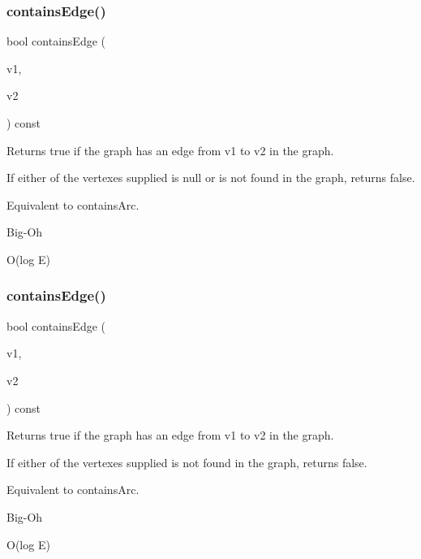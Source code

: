 \subsubsection{\texorpdfstring{contains\+Edge()}{containsEdge()}\hspace{0.1cm}{\footnotesize\ttfamily [1/3]}}
{\footnotesize\ttfamily bool contains\+Edge (\begin{DoxyParamCaption}\item[{\mbox{\hyperlink{classVertexGen}{Vertex\+Gen}}$<$ V, E $>$ $\ast$}]{v1,  }\item[{\mbox{\hyperlink{classVertexGen}{Vertex\+Gen}}$<$ V, E $>$ $\ast$}]{v2 }\end{DoxyParamCaption}) const}



Returns true if the graph has an edge from v1 to v2 in the graph. 

If either of the vertexes supplied is null or is not found in the graph, returns false.

Equivalent to contains\+Arc. \begin{DoxyRefDesc}{Big-\/\+Oh}
\item[\mbox{\hyperlink{BigOh__BigOh000011}{Big-\/\+Oh}}]O(log E) \end{DoxyRefDesc}
\mbox{\label{classBasicGraphGen_a4475808d2ed8a45b9fceecc2c6081fc3}} 
\subsubsection{\texorpdfstring{contains\+Edge()}{containsEdge()}\hspace{0.1cm}{\footnotesize\ttfamily [2/3]}}
{\footnotesize\ttfamily bool contains\+Edge (\begin{DoxyParamCaption}\item[{const std\+::string \&}]{v1,  }\item[{const std\+::string \&}]{v2 }\end{DoxyParamCaption}) const}



Returns true if the graph has an edge from v1 to v2 in the graph. 

If either of the vertexes supplied is not found in the graph, returns false.

Equivalent to contains\+Arc. \begin{DoxyRefDesc}{Big-\/\+Oh}
\item[\mbox{\hyperlink{BigOh__BigOh000012}{Big-\/\+Oh}}]O(log E) \end{DoxyRefDesc}
\mbox{\label{classBasicGraphGen_ad41e772ab382972e1c54ab6df781dd82}} 
